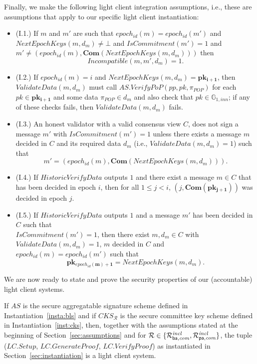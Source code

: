 \noindent Finally, we make the following light client integration assumptions, i.e., these are assumptions that 
apply to our specific light client instantiation: 
\begin{itemize}
\item (I.1.) If $m$ and $m'$ are such that 
$\mathit{epoch_{id}}(m) =\mathit{epoch_{id}}(m')$ and 
$\mathit{NextEpochKeys}(m, d_m) \neq \bot$ and 
$\mathit{IsCommitment}(m') = 1$ and 
$m' \neq (\mathit{epoch_{id}}(m), \mathbf{Com}(\mathit{NextEpochKeys}(m, d_m)))$ 
then $$\mathit{Incompatible}(m, m', d_m)=1.$$
\item (I.2.) If $\mathit{epoch_{id}}(m) =i$ and $\mathit{NextEpochKeys}(m, d_m)=\mathbf{pk_{i+1}}$, 
then $\mathit{ValidateData}(m, d_m)$ must call $\mathit{AS.VerifyPoP}(\mathit{pp}, \mathit{pk}, \mathit{\pi_{POP}})$ 
for each $pk \in \mathbf{pk_{i+1}}$ and some data $\mathit{\pi_{POP}} \in d_m$ and also check that
 $\mathit{pk} \in \mathbb{G}_{1,\mathit{inn}}$; if any of these checks fails, then $\mathit{ValidateData}(m, d_m)$ fails.
\item (I.3.) An honest validator with a valid consensus view $C$, does not sign a message $m'$ 
with $\mathit{IsCommitment}(m')=1$ unless there exists a message $m$ decided in $C$ 
and its required data $d_m$ (i.e., $\mathit{ValidateData}(m, d_m) =1$) such that 
$$m'=(\mathit{epoch_{id}}(m), \mathbf{Com}(\mathit{NextEpochKeys}(m, d_m))).$$ 
\item (I.4.) If $\mathit{HistoricVerifyData}$ outputs $1$ and there exist a message $m \in C$ 
that has been decided in epoch $i$, then for all $1 \leq j < i$, $(j, \mathbf{Com}(\mathbf{pk_{j+1}}))$ was decided in epoch $j$. 
\item (I.5.) If $\mathit{HistoricVerifyData}$ outputs $1$ and a message $m'$ has been decided in $C$ 
such that \\ $\mathit{IsCommitment}(m') = 1$, then there exist $m, d_m \in C$ with $\mathit{ValidateData}(m, d_m) = 1$, $m$ decided in $C$
and $\mathit{epoch_{id}}(m) = \mathit{epoch_{id}}(m')$ such that 
$$\mathbf{pk_{\mathit{epoch_{id}}(m)+1}} = \mathit{NextEpochKeys}(m, d_m).$$
\end{itemize}

\noindent We are now ready to state and prove the security properties of our (accountable) light client systems. 

\begin{theorem}
\label{th:soundness} 
If $\mathit{AS}$ is the secure aggregatable signature scheme defined in Instantiation~\ref{insta:bls} and if 
$\mathit{CKS_{\mathcal{R}}}$ is the secure committee key scheme defined in Instantiation~\ref{inst:cks}, then, together with 
the assumptions stated at the beginning of Section~\ref{sec:assumptions} and for $\mathcal{R} \in \{ \mathcal{R}^{\mathit{incl}}_{\mathsf{ba},\mathit{com}}, \mathcal{R}^{\mathit{incl}}_{\mathsf{pa},\mathit{com}} \}$, the tuple 
($\mathit{LC.Setup}$, $\mathit{LC.GenerateProof}$, $\mathit{LC.VerifyProof}$) as instantiated in Section~\ref{sec:instantiation} is a light client system.
\end{theorem}



